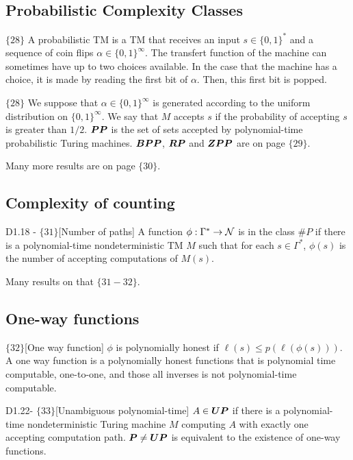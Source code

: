 \documentclass{article}
\begin{document}
\subsection{Probabilistic Complexity Classes}

$\{28\}$ A probabilistic TM is a TM that receives an input $s \in \{0,1\}^\ast$ and a sequence of coin flips $\alpha \in \{0,1\}^\infty$. The transfert function of the machine can sometimes have up to two choices available. In the case that the machine has a choice, it is made by reading the first bit of $\alpha$. Then, this first bit is popped.

$\{28\}$ We suppose that $\alpha \in \{0,1\}^\infty$ is generated according to the uniform distribution on $\{0,1\}^\infty$. We say that $M$ accepts $s$ if the probability of accepting $s$ is greater than $1/2$. $\boldsymbol{PP}$ is the set of sets accepted by polynomial-time probabilistic Turing machines. $\boldsymbol{BPP}$, $\boldsymbol{RP}$ and $\boldsymbol{ZPP}$ are on page $\{29\}$.

Many more results are on page $\{30\}$.

\subsection{Complexity of counting}

\begin{flexidefinition}{D1.18 - $\{31\}$}[Number of paths]
    A function $\phi : \Gamma^\ast \to \mathcal{N}$ is in the class $\# P$ if there is a polynomial-time nondeterministic TM $M$ such that for each $s \in \Gamma^\ast$, $\phi(s)$ is the number of accepting computations of $M(s)$.
\end{flexidefinition}

Many results on that $\{31-32\}$.

\subsection{One-way functions}

\begin{flexidefinition}{$\{32\}$}[One way function]
    $\phi$ is polynomially honest if $\ell(s) \leq p(\ell(\phi(s)))$. A one way function is a polynomially honest functions that is polynomial time computable, one-to-one, and those all inverses is not polynomial-time computable.
\end{flexidefinition}

\begin{flexidefinition}{D1.22- $\{33\}$}[Unambiguous polynomial-time]
    $A \in \boldsymbol{UP}$ if there is a polynomial-time nondeterministic Turing machine $M$ computing $A$ with exactly one accepting computation path. $\boldsymbol{P} \neq \boldsymbol{UP}$ is equivalent to the existence of one-way functions.
\end{flexidefinition}
\end{document}
